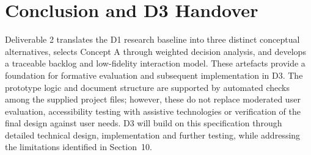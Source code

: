 \documentclass[12pt,a4paper]{article}
\begin{document}
\section{Conclusion and D3 Handover}
Deliverable 2 translates the D1 research baseline into three distinct conceptual alternatives, selects Concept A through weighted decision analysis, and develops a traceable backlog and low-fidelity interaction model. These artefacts provide a foundation for formative evaluation and subsequent implementation in D3. The prototype logic and document structure are supported by automated checks among the supplied project files; however, these do not replace moderated user evaluation, accessibility testing with assistive technologies or verification of the final design against user needs. D3 will build on this specification through detailed technical design, implementation and further testing, while addressing the limitations identified in Section~10.
\vspace{0.45cm}
\noindent{\color{Teal}\rule{\linewidth}{0.8pt}}
\begingroup
\setlength{\parskip}{0.15em}
\end{document}
